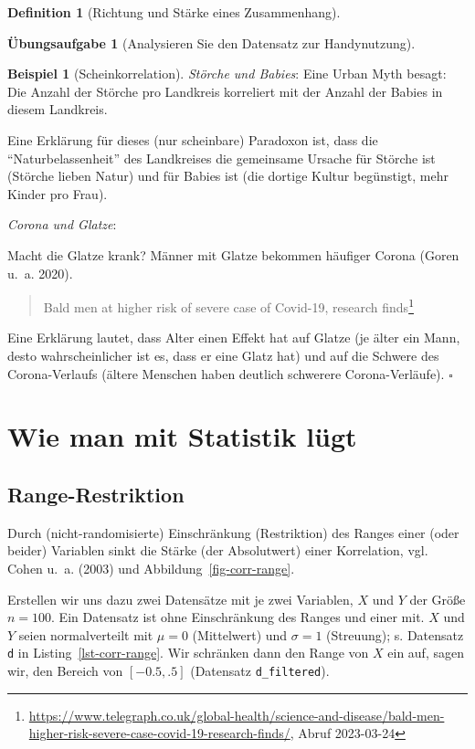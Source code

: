 \documentclass[
  a4paper,
  DIV=11]{scrreprt}
\theoremstyle{definition}
\newtheorem{exercise}{Übungsaufgabe}[chapter]
\theoremstyle{definition}
\newtheorem{example}{Beispiel}[chapter]
\theoremstyle{definition}
\newtheorem{definition}{Definition}[chapter]
\theoremstyle{remark}
\begin{document}
\begin{definition}[Richtung und Stärke eines
Zusammenhang]
\begin{exercise}[Analysieren Sie den Datensatz zur
Handynutzung]
\begin{example}[Scheinkorrelation]
\emph{Störche und Babies}: Eine Urban Myth besagt: Die Anzahl der
Störche pro Landkreis korreliert mit der Anzahl der Babies in diesem
Landkreis.

Eine Erklärung für dieses (nur scheinbare) Paradoxon ist, dass die
``Naturbelassenheit'' des Landkreises die gemeinsame Ursache für Störche
ist (Störche lieben Natur) und für Babies ist (die dortige Kultur
begünstigt, mehr Kinder pro Frau).

\emph{Corona und Glatze}:

Macht die Glatze krank? Männer mit Glatze bekommen häufiger Corona
(Goren u.~a. 2020).

\begin{quote}
Bald men at higher risk of severe case of Covid-19, research
finds\footnote{\url{https://www.telegraph.co.uk/global-health/science-and-disease/bald-men-higher-risk-severe-case-covid-19-research-finds/},
  Abruf 2023-03-24}
\end{quote}

Eine Erklärung lautet, dass Alter einen Effekt hat auf Glatze (je älter
ein Mann, desto wahrscheinlicher ist es, dass er eine Glatz hat) und auf
die Schwere des Corona-Verlaufs (ältere Menschen haben deutlich
schwerere Corona-Verläufe). \(\square\)

\end{example}

\section{Wie man mit Statistik
lügt}\label{wie-man-mit-statistik-luxfcgt-3}

\subsection{Range-Restriktion}\label{range-restriktion}

Durch (nicht-randomisierte) Einschränkung (Restriktion) des Ranges einer
(oder beider) Variablen sinkt die Stärke (der Absolutwert) einer
Korrelation, vgl. Cohen u.~a. (2003) und Abbildung~\ref{fig-corr-range}.

Erstellen wir uns dazu zwei Datensätze mit je zwei Variablen, \(X\) und
\(Y\) der Größe \(n=100\). Ein Datensatz ist ohne Einschränkung des
Ranges und einer mit. \(X\) und \(Y\) seien normalverteilt mit \(\mu=0\)
(Mittelwert) und \(\sigma=1\) (Streuung); s. Datensatz \texttt{d} in
Listing~\ref{lst-corr-range}. Wir schränken dann den Range von \(X\) ein
auf, sagen wir, den Bereich von \([-0.5, .5]\) (Datensatz
\texttt{d\_filtered}).


\end{exercise}
\end{definition}
\end{document}
